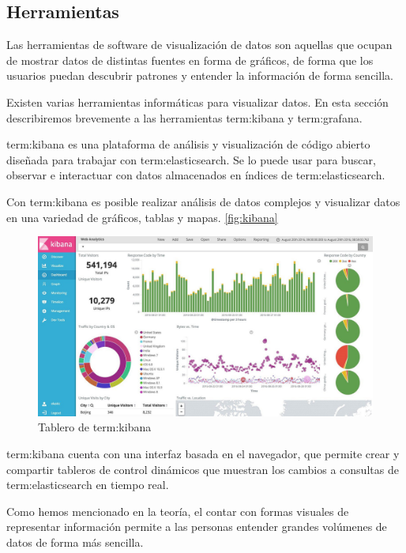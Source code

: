 \subsection{Herramientas}
\label{herramientas-de-visualizacion}

Las herramientas de software de visualización de datos son aquellas que ocupan
de mostrar datos de distintas fuentes en forma de gráficos, de forma que los
usuarios puedan descubrir patrones y entender la información de forma sencilla.

Existen varias herramientas informáticas para visualizar datos. En esta sección
describiremos brevemente a las herramientas \gls{term:kibana} y
\gls{term:grafana}.

\gls{term:kibana} es una plataforma de análisis y visualización de código
abierto diseñada para trabajar con \gls{term:elasticsearch}. Se lo puede usar
para buscar, observar e interactuar con datos almacenados en índices de
\gls{term:elasticsearch}.

Con \gls{term:kibana} es posible realizar análisis de datos complejos y
visualizar datos en una variedad de gráficos, tablas y mapas.
\autoref{fig:kibana}


\begin{figure}
  \includegraphics[width=\linewidth]{src/images/05-capitulo-5/kibana.jpg}
  \caption{Tablero de \gls{term:kibana}}
  \label{fig:kibana}
\end{figure}

\gls{term:kibana} cuenta con una interfaz basada en el navegador, que permite
crear y compartir tableros de control dinámicos que muestran los cambios a
consultas de \gls{term:elasticsearch} en tiempo real.

Como hemos mencionado en la teoría, el contar con formas visuales de
representar información permite a las personas entender grandes volúmenes de
datos de forma más sencilla.


